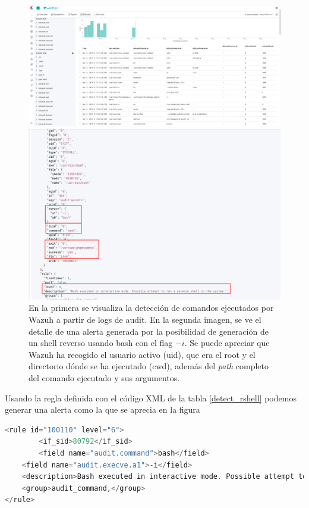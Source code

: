 \begin{figure}[!hbt]
  \centering
    \includegraphics[width=\textwidth]{imagenes/kibana-root-comands.png}

  \includegraphics[width=\textwidth]{imagenes/reverse_detected.png}
  \caption{En la primera se visualiza la detección de comandos ejecutados por Wazuh a partir de logs de audit. En la segunda imagen, se ve el detalle de una alerta generada por la posibilidad de generación de un shell reverso usando bash con el flag $-i$. Se puede apreciar que Wazuh ha recogido el usuario activo (uid), que era el root y el directorio dónde se ha ejecutado (cwd), además del \textit{path} completo del comando ejecutado y sus argumentos.}
   \label{vulnerabilities}
\end{figure}


Usando la regla definida con el código XML de la tabla \ref{detect_rshell} podemos generar una alerta como la que se aprecia en la figura 

\begin{lstlisting}[language=php,caption={Regla para detección de reverse shells.}, label=detect_rshell]
<rule id="100110" level="6">
        <if_sid>80792</if_sid>
        <field name="audit.command">bash</field>
    <field name="audit.execve.a1">-i</field>
    <description>Bash executed in interactive mode. Possible attempt to run a reverse shell on the system.</description>
    <group>audit_command,</group>
</rule>

\end{lstlisting}

